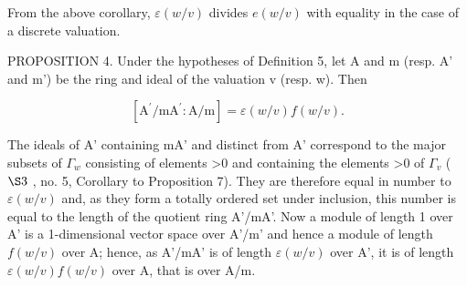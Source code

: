 From the above corollary, \(\varepsilon(w/v)\) divides \(e(w/v)\) with equality in the case of a discrete valuation.

PROPOSITION 4. Under the hypotheses of Definition 5, let A and m (resp. A' and m') be the ring and ideal of the valuation v (resp. w). Then

\[
[ \mathrm{A} ^ {\prime} / \mathrm{mA} ^ {\prime}: \mathrm{A} / \mathrm{m} ] = \varepsilon (w / v) f (w / v).
\]

The ideals of A' containing mA' and distinct from A' correspond to the major subsets of \(\Gamma_{w}\) consisting of elements \textgreater0 and containing the elements \textgreater0 of \(\Gamma_{v}\) ( \(\S3\) , no. 5, Corollary to Proposition 7). They are therefore equal in number to \(\varepsilon(w/v)\) and, as they form a totally ordered set under inclusion, this number is equal to the length of the quotient ring A'/mA'. Now a module of length 1 over A' is a 1-dimensional vector space over A'/m' and hence a module of length \(f(w/v)\) over A; hence, as A'/mA' is of length \(\varepsilon(w/v)\) over A', it is of length \(\varepsilon(w/v)f(w/v)\) over A, that is over A/m.

